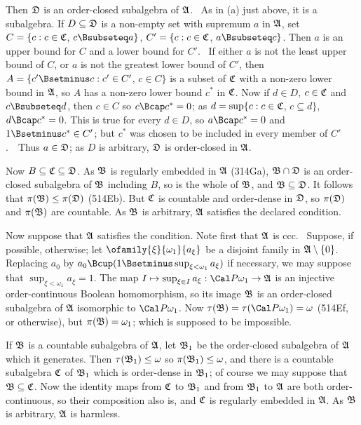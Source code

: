 {\noindent Then $\frak D$ is an order-closed subalgebra of $\frak A$.
\Prf\ As in (a) just above, it is a subalgebra.
If $D\subseteq\frak D$ is a non-empty set with supremum
$a$ in $\frak A$, set $C=\{c:c\in\frak C$, $c\Bsubseteq a\}$,
$C'=\{c:c\in\frak C$, $a\Bsubseteq c\}$.   Then
$a$ is an upper bound for $C$ and a lower bound for $C'$.   \Quer\ If either $a$ is
not the least upper bound of $C$, or $a$ is not the greatest lower bound of $C'$, then
$A=\{c'\Bsetminus c:c'\in C'$, $c\in C\}$ is a subset of $\frak C$ with a non-zero lower
bound in $\frak A$, so $A$ has a non-zero lower bound $c^*$ in $\frak C$.
Now if $d\in D$, $c\in\frak C$ and $c\Bsubseteq d$, then $c\in C$ so $c\Bcap c^*=0$;
as $d=\sup\{c:c\in\frak C$, $c\subseteq d\}$, $d\Bcap c^*=0$.   This is true for every
$d\in D$, so $a\Bcap c^*=0$ and $1\Bsetminus c^*\in C'$;  but $c^*$ was chosen to be
included in every member of $C'$.\ \BanG\  Thus $a\in\frak D$;  as $D$ is arbitrary,
$\frak D$ is order-closed in $\frak A$.\ \Qed

Now $B\subseteq\frak C\subseteq\frak D$.
As $\frak B$ is regularly embedded in $\frak A$ (314Ga),
$\frak B\cap\frak D$ is an order-closed subalgebra of $\frak B$
including $B$, so is the whole of $\frak B$,
and $\frak B\subseteq\frak D$.   It
follows that $\pi(\frak B)\le\pi(\frak D)$ (514Eb).   But
$\frak C$ is countable and order-dense in $\frak D$,
so $\pi(\frak D)$ and $\pi(\frak B)$ are countable.
As $\frak B$ is arbitrary, $\frak A$ satisfies the declared condition.

\medskip

 Now suppose that $\frak A$ satisfies the condition.   Note first that
$\frak A$ is ccc.   \Prf\Quer\ Suppose, if possible, otherwise;  let
$\ofamily{\xi}{\omega_1}{a_{\xi}}$ be a disjoint family in
$\frak A\setminus\{0\}$.   Replacing $a_0$ by
$a_0\Bcup(1\Bsetminus\sup_{\xi<\omega_1}a_{\xi})$ if necessary, we
may suppose that $\sup_{\xi<\omega_1}a_{\xi}=1$.   The map
$I\mapsto\sup_{\xi\in I}a_{\xi}:\Cal P\omega_1\to\frak A$
is an injective order-continuous
Boolean homomorphism, so its image $\frak B$ is an order-closed subalgebra of
$\frak A$ isomorphic to $\Cal P\omega_1$.   Now
$\tau(\frak B)=\tau(\Cal P\omega_1)=\omega$ (514Ef, or otherwise),
but $\pi(\frak B)=\omega_1$;  which is supposed to be impossible.\
\Bang\Qed

If $\frak B$ is a countable subalgebra of $\frak A$,
let $\frak B_1$ be the order-closed
subalgebra of $\frak A$ which it generates.   Then
$\tau(\frak B_1)\le\omega$ so
$\pi(\frak B_1)\le\omega$, and there is a countable subalgebra $\frak C$ of
$\frak B_1$ which is order-dense in $\frak B_1$;  of course we may suppose that
$\frak B\subseteq\frak C$.   Now the identity maps from $\frak C$ to $\frak B_1$ and
from $\frak B_1$ to $\frak A$ are both order-continuous, so their composition also is,
and $\frak C$ is regularly embedded in $\frak A$.   As $\frak B$ is arbitrary,
$\frak A$ is harmless.

}
